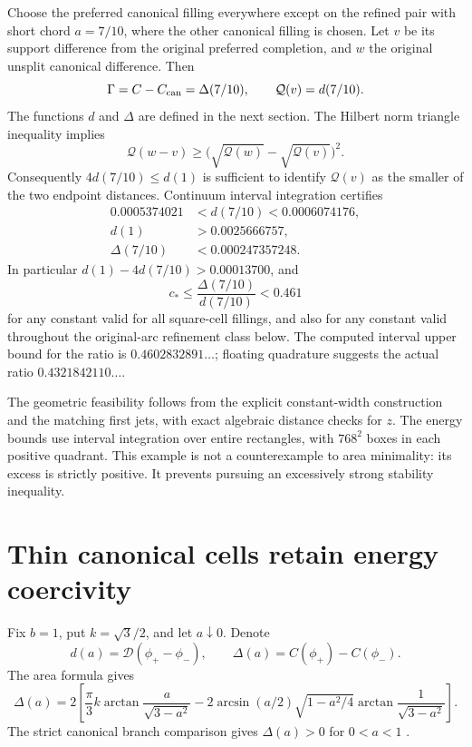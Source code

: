 \documentclass[11pt]{article}
\theoremstyle{remark}\newtheorem{remark}[theorem]{Remark}
\newcommand{\Q}{\mathcal Q}
\newcommand{\Dir}{\mathcal D}
\begin{document}
Choose the preferred canonical filling everywhere except on the refined pair with short chord $a=7/10$, where the other canonical filling is chosen. Let $v$ be its support difference from the original preferred completion, and $w$ the original unsplit canonical difference. Then
\[
 \Gamma=C-C_{\rm can}=\Delta(7/10),\qquad
 \Q(v)=d(7/10).
\]
The functions $d$ and $\Delta$ are defined in the next section. The Hilbert norm triangle inequality implies
\[
 \Q(w-v)\geq\big(\sqrt{\Q(w)}-\sqrt{\Q(v)}\big)^2.
\]
Consequently $4d(7/10)\leq d(1)$ is sufficient to identify $\Q(v)$ as the smaller of the two endpoint distances. Continuum interval integration certifies
\[
 \begin{split}
 0.0005374021&<d(7/10)<0.0006074176,\\
 d(1)&>0.0025666757,\\
 \Delta(7/10)&<0.000247357248.
 \end{split}
\]
In particular $d(1)-4d(7/10)>0.00013700$, and
\begin{equation}\label{cell:cupper}
 \boxed{c_*\leq\frac{\Delta(7/10)}{d(7/10)}<0.461}
\end{equation}
for any constant valid for all square-cell fillings, and also for any constant valid throughout the original-arc refinement class below. The computed interval upper bound for the ratio is $0.4602832891\ldots$; floating quadrature suggests the actual ratio $0.4321842110\ldots$.

The geometric feasibility follows from the explicit constant-width construction and the matching first jets, with exact algebraic distance checks for $z$. The energy bounds use interval integration over entire rectangles, with $768^2$ boxes in each positive quadrant. This example is not a counterexample to area minimality: its excess is strictly positive. It prevents pursuing an excessively strong stability inequality.

\section{Thin canonical cells retain energy coercivity}\label{cell:thin}
Fix $b=1$, put $k=\sqrt3/2$, and let $a\downarrow0$. Denote
\[
 d(a)=\Dir(\phi_+-\phi_-),\qquad
 \Delta(a)=C(\phi_+)-C(\phi_-).
\]
The area formula gives
\begin{equation}\label{cell:gap}
 \Delta(a)=2\left[\frac\pi3 k\arctan\frac{a}{\sqrt{3-a^2}}
 -2\arcsin(a/2)\sqrt{1-a^2/4}\arctan\frac1{\sqrt{3-a^2}}\right].
\end{equation}
The strict canonical branch comparison gives $\Delta(a)>0$ for $0<a<1$ \cite{BogoselVolume,BogoselDangling}.
\end{document}
